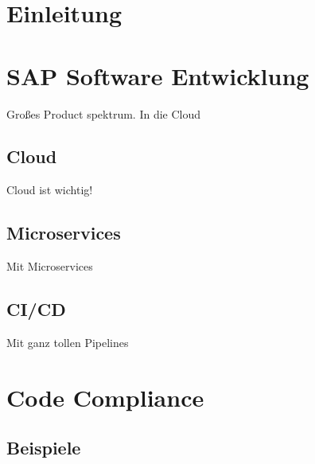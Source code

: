 \documentclass[
	12pt, %
	a4paper,
	liststotoc, %
	bibtotoc, %
	pointlessnumbers, %
	ngerman, %
	headsepline, %
	oneside %
	]{scrbook} %
\begin{document}

\newpage

\tableofcontents{}

\listoffigures
\listoftables


\printnoidxglossaries

\clearpage



\chapter{Einleitung}\label{ch:einleitung}


\chapter{SAP Software Entwicklung}\label{ch:sap_software_entwicklung}

Großes Product spektrum. In die Cloud

\section{Cloud}\label{sec:cloud}

Cloud ist wichtig!

\section{Microservices}\label{sec:microservices}

Mit Microservices

\section{CI/CD}\label{sec:cicd}

Mit ganz tollen Pipelines

\chapter{Code Compliance}\label{ch:code_compliance}

\section{Beispiele}\label{sec:compliance_beispiele}
\end{document}
